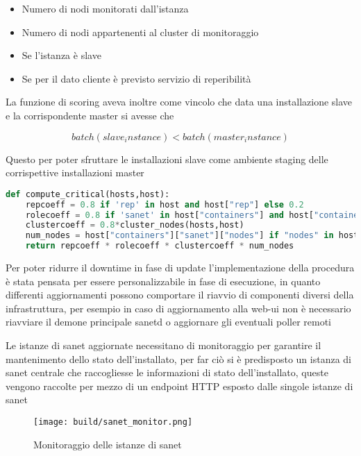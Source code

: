 \begin{itemize}
  \item{Numero di nodi monitorati dall'istanza}
  \item{Numero di nodi appartenenti al cluster di monitoraggio}
  \item{Se l'istanza è slave}
  \item{Se per il dato cliente è previsto servizio di reperibilità}
\end{itemize}

\newpage
La funzione di scoring aveva inoltre come vincolo che data una installazione slave e la corrispondente master si avesse che

\begin{equation}
  batch(slave_instance) < batch(master_instance)
\end{equation}

Questo per poter sfruttare le installazioni slave come ambiente staging delle corrispettive installazioni master

\begin{lstlisting}[language=python]
def compute_critical(hosts,host):
    repcoeff = 0.8 if 'rep' in host and host["rep"] else 0.2
    rolecoeff = 0.8 if 'sanet' in host["containers"] and host["containers"]["sanet"]["role"] == "prod" else 0.2
    clustercoeff = 0.8*cluster_nodes(hosts,host)
    num_nodes = host["containers"]["sanet"]["nodes"] if "nodes" in host["containers"]["sanet"] else 1
    return repcoeff * rolecoeff * clustercoeff * num_nodes
\end{lstlisting}

Per poter ridurre il downtime in fase di update l'implementazione della procedura è stata pensata per essere personalizzabile in fase di esecuzione, in quanto differenti aggiornamenti possono comportare il riavvio di componenti diversi della infrastruttura, per esempio in caso di aggiornamento alla web-ui non è necessario riavviare il demone principale sanetd o aggiornare gli eventuali poller remoti

Le istanze di sanet aggiornate necessitano di monitoraggio per garantire il mantenimento dello stato dell'installato, per far ciò si è predisposto un istanza di sanet centrale che raccogliesse le informazioni di stato dell'installato, queste vengono raccolte per mezzo di un endpoint HTTP esposto dalle singole istanze di sanet

\begin{figure}[H]
    \centering
    \texttt{[image: build/sanet\_monitor.png]}
    \caption{Monitoraggio delle istanze di sanet}
    \label{fig:sanet_monitor}
\end{figure}

